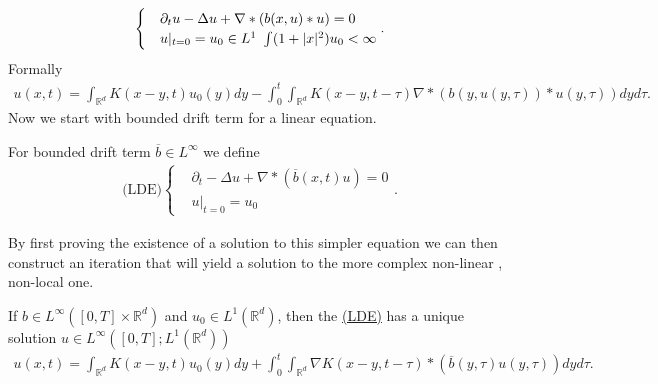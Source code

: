 \begin{align*}
  \begin{cases}
    &\partial_t u  - \Delta u + \nabla * (b(x,u)*u) = 0\\
    &u \rvert_{t=0} =u_{0} \in  L^{1} \ \int (1+\lvert x\rvert^2)u_{0} <\infty
  \end{cases}
.\end{align*}
Formally
\begin{align*}
  u(x,t)  = \int_{\mathbb{R}^{d} } K(x-y,t)u_{0}(y) dy - \int_0^{t} \int_{\mathbb{R}^{d} }K(x-y,t-\tau ) \nabla * (b(y,u(y,\tau ))*u(y,\tau ))dy d\tau 
.\end{align*}
Now we start with bounded drift term for a linear equation.
\begin{definition}[LDE]\label{LDE}
  For bounded drift term $\overline{b} \in  L^{\infty}  $ we define
\begin{align*}
  \text{(LDE)}\begin{cases}
    &\partial_t - \Delta u + \nabla * (\overline{b}(x,t)u ) = 0 \\ 
    & u \rvert_{t=0} = u_{0}
  \end{cases}
.\end{align*}
\end{definition}
\begin{remark}
  By first proving the existence of a solution to this simpler equation we can then construct an iteration that will yield
a solution to the more complex non-linear , non-local one.
\end{remark}
\begin{theorem}
  If $b \in  L^{\infty}([0,T] \times  \mathbb{R}^{d} ) $  and $u_{0} \in  L^1(\mathbb{R}^{d} )$, then the \hyperref[LDE]{(LDE)} has a 
  unique solution $u \in L^{\infty}([0,T];L^{1}(\mathbb{R}^{d} ) ) $
  \begin{align*}
    u(x,t) = \int_{\mathbb{R}^{d} }K(x-y,t)u_{0}(y) dy  + \int_{0}^{t} \int_{\mathbb{R}^{d} } \nabla K(x-y,t-\tau ) * (\overline{b}(y,\tau )u(y,\tau ) ) dy d\tau 
  .\end{align*}
\end{theorem}
